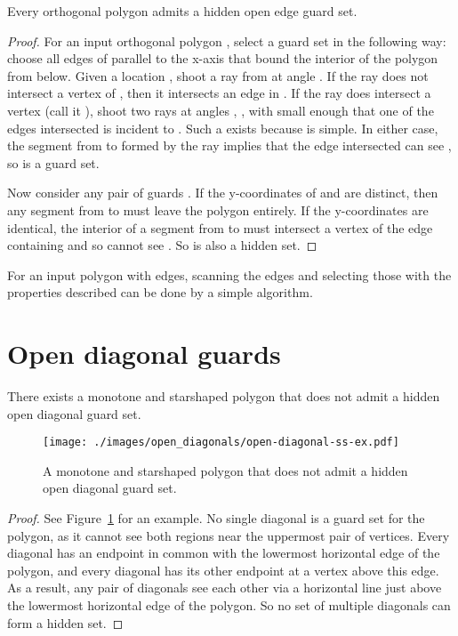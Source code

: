 \documentclass{cccg12}
\begin{document}
\begin{lemma}
\label{lem:hidden-open-edge-ortho}
Every orthogonal polygon admits a hidden open edge guard set.
\end{lemma}

\begin{proof}
For an input orthogonal polygon , select a guard set  in the following way: choose all edges of  parallel to the x-axis that bound the interior of the polygon from below. 
Given a location , shoot a ray from  at angle .
If the ray does not intersect a vertex of , then it intersects an edge in .
If the ray does intersect a vertex (call it ), shoot two rays at angles , , with  small enough that one of the edges intersected is incident to .
Such a  exists because  is simple.
In either case, the segment from  to  formed by the ray implies that the edge intersected can see , so  is a guard set. 

Now consider any pair of guards .
If the y-coordinates of  and  are distinct, then any segment from  to  must leave the polygon entirely.
If the y-coordinates are identical, the interior of a segment from  to  must intersect a vertex of the edge containing  and so  cannot see .
So  is also a hidden set.
\end{proof}

For an input polygon with  edges, scanning the edges and selecting those with the properties described can be done by a simple  algorithm.

\section{Open diagonal guards}

\begin{lemma}
There exists a monotone and starshaped polygon that does not admit a hidden open diagonal guard set.
\end{lemma}

\begin{figure}[ht]
\centering
\texttt{[image: ./images/open\_diagonals/open-diagonal-ss-ex.pdf]}
\caption{A monotone and starshaped polygon that does not admit a hidden open diagonal guard set.}
\label{fig:open-diagonal-ss-ex}
\end{figure}

\begin{proof}
See Figure~\ref{fig:open-diagonal-ss-ex} for an example.
No single diagonal is a guard set for the polygon, as it cannot see both regions near the uppermost pair of vertices.
Every diagonal has an endpoint in common with the lowermost horizontal edge of the polygon, and every diagonal has its other endpoint at a vertex above this edge.
As a result, any pair of diagonals see each other via a horizontal line just above the lowermost horizontal edge of the polygon.
So no set of multiple diagonals can form a hidden set.
\end{proof}
\end{document}
